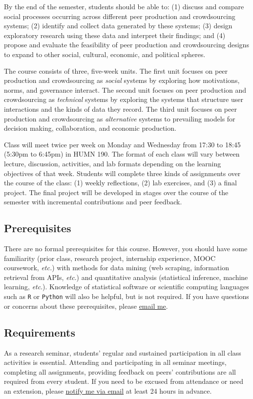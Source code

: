 \documentclass[11pt]{memoir}
\begin{document}
By the end of the semester, students should be able to: (1) discuss and compare social processes occurring across different peer production and crowdsourcing systems; (2) identify and collect data generated by these systems; (3) design exploratory research using these data and interpret their findings; and (4) propose and evaluate the feasibility of peer production and crowdsourcing designs to expand to other social, cultural, economic, and political spheres.

The course consists of three, five-week units. The first unit focuses on peer production and crowdsourcing as \textit{social} systems by exploring how motivations, norms, and governance interact. The second unit focuses on peer production and crowdsourcing as \textit{technical} systems by exploring the systems that structure user interactions and the kinds of data they record. The third unit focuses on peer production and crowdsourcing as \textit{alternative} systems to prevailing models for decision making, collaboration, and economic production.

Class will meet twice per week on Monday and Wednesday from 17:30 to 18:45 (5:30pm to 6:45pm) in HUMN 190. The format of each class will vary between lecture, discussion, activities, and lab formats depending on the learning objectives of that week. Students will complete three kinds of assignments over the course of the class: (1) weekly reflections, (2) lab exercises, and (3) a final project. The final project will be developed in stages over the course of the semester with incremental contributions and peer feedback.

\subsection{Prerequisites}
There are no formal prerequisites for this course. However, you should have some familiarity (prior class, research project, internship experience, MOOC coursework, \textit{etc.}) with methods for data mining (web scraping, information retrieval from APIs, \textit{etc}.) and quantitative analysis (statistical inference, machine learning, \textit{etc}.). Knowledge of statistical software or scientific computing languages such as \texttt{R} or \texttt{Python} will also be helpful, but is not required. If you have questions or concerns about these prerequisites, please \href{mailto:brian.keegan@colorado.edu}{email me}.

\subsection{Requirements}
As a research seminar, students' regular and sustained participation in all class activities is essential. Attending and participating in all seminar meetings, completing all assignments, providing feedback on peers' contributions are all required from every student. If you need to be excused from attendance or need an extension, please \href{mailto:brian.keegan@colorado.edu}{notify me via email} at least 24 hours in advance.
\end{document}
